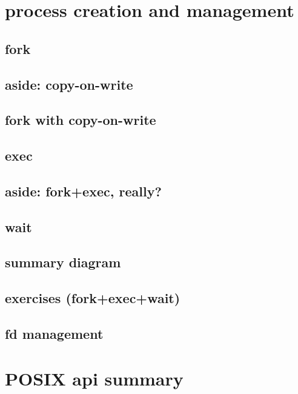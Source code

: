 
\section{process creation and management}





\subsection{fork}



\subsection{aside: copy-on-write}


\subsection{fork with copy-on-write}






\subsection{exec}






\subsection{aside: fork+exec, really?}



\subsection{wait}




\subsection{summary diagram}




\subsection{exercises (fork+exec+wait)}



\subsection{fd management}



\section{POSIX api summary}

